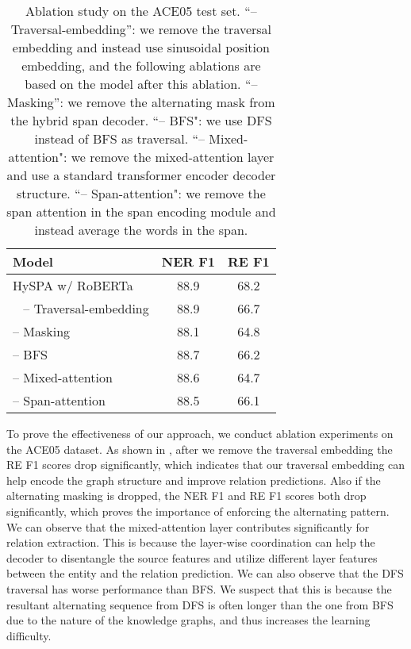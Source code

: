 \documentclass[11pt,a4paper]{article}
\begin{document}
\begin{table}[t!]
\begin{center}
\begin{tabular}{lcc} 
\toprule \bf Model & \bf NER F1 & \bf RE F1 \\ \midrule
HySPA  w/ RoBERTa &88.9 &68.2  \\
~ -- Traversal-embedding  &88.9 &66.7 \\
\quad -- Masking  &88.1 &64.8 \\
\quad -- BFS  &88.7 &66.2  \\
\quad -- Mixed-attention  &88.6 &64.7  \\
\quad -- Span-attention  &88.5 &66.1 \\
\bottomrule
\end{tabular}
\end{center}
\caption{\label{abm} Ablation study on the ACE05 test set. ``-- Traversal-embedding'': we remove the traversal embedding and instead use sinusoidal position embedding, and the following ablations are based on the model after this ablation. ``-- Masking'':  we remove the alternating mask from the  hybrid span decoder. ``-- BFS": we use DFS instead of BFS as traversal. ``-- Mixed-attention":  we remove the mixed-attention layer and use a standard transformer encoder decoder structure. ``-- Span-attention":  we remove the span attention in the span encoding module and instead average the words in the span.}
\end{table} 


To prove the effectiveness of our approach, we conduct ablation experiments on the ACE05 dataset. As shown in , after we remove the traversal embedding the RE F1 scores drop significantly, which indicates that our traversal embedding can help encode the graph structure and improve relation predictions. Also if the alternating masking is dropped, the NER F1 and RE F1 scores both drop significantly, which proves the importance of enforcing the alternating pattern. 
We can observe that the mixed-attention layer contributes significantly for relation extraction. This is because the layer-wise coordination can help the decoder to disentangle the source features and utilize different layer features between the entity and the relation prediction. We can also observe that the DFS traversal has worse performance than BFS. We suspect that this is because the resultant alternating sequence from DFS is often longer than the one from BFS due to the nature of the knowledge graphs, and thus increases the learning difficulty.
\end{document}
